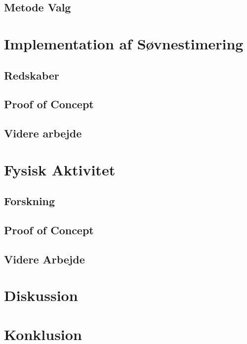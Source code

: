 \section{Metode Valg}\label{sec:metodevalg}



\chapter{Implementation af Søvnestimering}

\section{Redskaber}\label{sec:redskaber}

\section{Proof of Concept}


\label{sec:verisoevn}
\section{Videre arbejde}\label{sec:videre-arbejde}









\chapter{Fysisk Aktivitet}

\section{Forskning}

\section{Proof of Concept}

\section{Videre Arbejde}\label{sec:videre-arbejde-fa}


\chapter{Diskussion}


\chapter{Konklusion}




\label{bib:mybiblio}

\appendix

